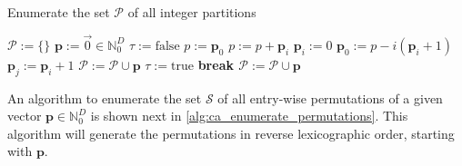 \documentclass[a4paper,10pt]{article}
\begin{document}
\begin{algorithm}[h!]
  \caption{Enumerate the set $\mathcal{P}$ of all integer partitions}
  \label{alg:ca_enumerate_integer_partitions}
  \begin{algorithmic}
      \State $\mathcal{P} := \{\}$
      \State $\mathbf{p} := \vec{0} \in \mathbb{N}_{0}^{D}$
        \State $\tau := \mathrm{false}$
        \State $p := \mathbf{p}_{0}$
          \State $p := p + \mathbf{p}_i$
            \State $\mathbf{p}_{i} := 0$
          \Else
            \State $\mathbf{p}_{0} := p - i (\mathbf{p}_{i} + 1)$
              \State $\mathbf{p}_{j} := \mathbf{p}_{i} + 1$
            \EndFor
            \State $\mathcal{P} := \mathcal{P} \cup \mathbf{p}$
            \State $\tau := \mathrm{true}$
            \State \bf{break}
          \EndIf
        \EndFor
            \State $\mathcal{P} := \mathcal{P} \cup \mathbf{p}$
          \EndIf
        \EndIf
      \EndWhile
    \EndProcedure
  \end{algorithmic}
\end{algorithm}

An algorithm to enumerate the set $\mathcal{S}$ of all entry-wise
permutations of a given vector $\mathbf{p} \in \mathbb{N}_{0}^{D}$
is shown next in \eqref{alg:ca_enumerate_permutations}. This algorithm
will generate the permutations in reverse lexicographic order,
starting with $\mathbf{p}$.
\end{document}
